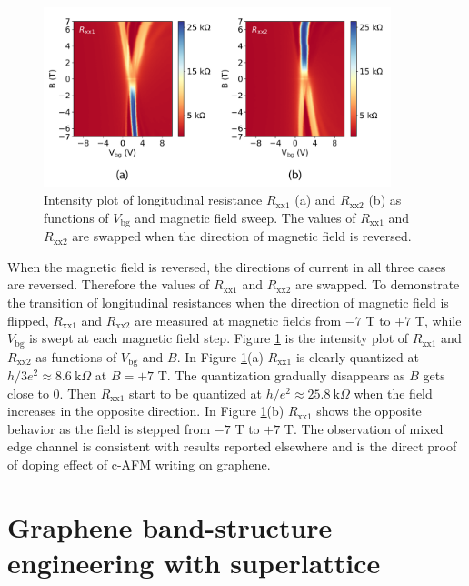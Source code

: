\documentclass[pdflatex, sectionletters, 12pt]{pittetd}    %
\begin{document}
\begin{figure}[h!]
	\centering
	\includegraphics[width=0.90\textwidth]{Drawing/MixingIntensityPlot.pdf}
	\caption{Intensity plot of longitudinal resistance $R_\mathrm{xx1}$ (a) and $R_\mathrm{xx2}$ (b) as functions of $V_\mathrm{bg}$ and magnetic field sweep. The values of $R_\mathrm{xx1}$ and $R_\mathrm{xx2}$ are swapped when the direction of magnetic field is reversed.}
	\label{FIG:MixingIntensityPlot}
\end{figure}

When the magnetic field is reversed, the directions of current in all three cases are reversed. Therefore the values of $R_\mathrm{xx1}$ and $R_\mathrm{xx2}$ are swapped. To demonstrate the transition of longitudinal resistances when the direction of magnetic field is flipped, $R_\mathrm{xx1}$ and $R_\mathrm{xx2}$ are measured at magnetic fields from $-7$ T to $+7$ T, while $V_\mathrm{bg}$ is swept at each magnetic field step. Figure \ref{FIG:MixingIntensityPlot} is the intensity plot of $R_\mathrm{xx1}$ and $R_\mathrm{xx2}$ as functions of $V_\mathrm{bg}$ and $B$. In Figure \ref{FIG:MixingIntensityPlot}(a) $R_\mathrm{xx1}$ is clearly quantized at $h/3e^2 \approx 8.6 \ \mathrm{k}\Omega$ at $B = +7$ T. The quantization gradually disappears as $B$ gets close to 0. Then $R_\mathrm{xx1}$ start to be quantized at $h/e^2 \approx 25.8 \ \mathrm{k}\Omega$ when the field increases in the opposite direction. In Figure \ref{FIG:MixingIntensityPlot}(b) $R_\mathrm{xx1}$ shows the opposite behavior as the field is stepped from $-7$ T to $+7$ T. The observation of mixed edge channel is consistent with results reported elsewhere\cite{williams2007quantum, lohmann2009four, amet2014selective, abanin2007quantized, ki2010dependence, klimov2015edge, woszczyna2011graphene, ozyilmaz2007electronic, schmidt2013mixing} and is the direct proof of doping effect of c-AFM writing on graphene.

\section{Graphene band-structure engineering with superlattice}
\end{document}
